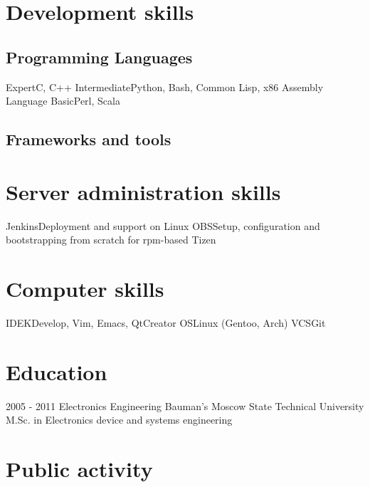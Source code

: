\documentclass[11pt,a4paper]{moderncv}
\begin{document}
\section{Development skills}
\subsection{Programming Languages}
\cvitem
  {Expert}{C, C++}
\cvitem
  {Intermediate}{Python, Bash, Common Lisp, x86 Assembly Language}
\cvitem
  {Basic}{Perl, Scala}
\subsection{Frameworks and tools}

\section{Server administration skills}
\cvitem
  {Jenkins}{Deployment and support on Linux}
\cvitem
  {OBS}{Setup, configuration and bootstrapping from scratch for rpm-based Tizen}

\section{Computer skills}
  \cvitem
  {IDE}{KDevelop, Vim, Emacs, QtCreator}
  \cvitem
  {OS}{Linux (Gentoo, Arch)}
  \cvitem
  {VCS}{Git}

\section{Education}
  \cventry
    {2005 - 2011}
    {Electronics Engineering}
    {Bauman's Moscow State Technical University}
    {}{}
    {M.Sc. in Electronics device and systems engineering}

\section{Public activity}
\end{document}
